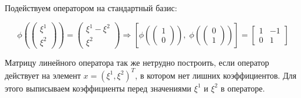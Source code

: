 \documentclass{article}
\begin{document}
\begin{center}
Подействуем оператором на стандартный базис:
\end{center}
\noindent$$\phi(\left(\begin{array}{c}\xi^1 \\ \xi^2\end{array}\right)) = \left(\begin{array}{c}\xi^1 - \xi^2 \\ \xi^2\end{array}\right) \Rightarrow
\left[\phi(\left(\begin{array}{c}1 \\ 0\end{array}\right)),\; \phi(\left(\begin{array}{c}0 \\ 1\end{array}\right))\right] =
\left[\begin{array}{rr}
1 & -1 \\ 0 & 1
\end{array}\right]$$
\begin{center}
Матрицу линейного оператора так же нетрудно построить, если оператор действует на элемент $x = (\xi^1, \xi^2)^T$, в котором нет лишних коэффициентов. Для этого выписываем коэффициенты перед значениями $\xi^1$ и $\xi^2$ в операторе. 
\end{center}
\end{document}
